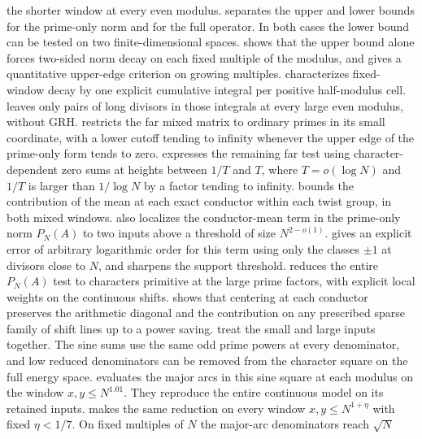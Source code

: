 \documentclass[11pt,a4paper]{article}
\numberwithin{equation}{section}
\begin{document}
the shorter window at every even modulus.
 separates the upper and lower bounds for
the prime-only norm and for the full operator. In both cases
the lower bound can be tested on two finite-dimensional spaces.
 shows that the upper bound alone forces
two-sided norm decay on each fixed multiple of the modulus, and gives
a quantitative upper-edge criterion on growing multiples.
 characterizes fixed-window decay
by one explicit cumulative integral per positive half-modulus cell.
 leaves only pairs of long divisors
in those integrals at every large even modulus, without GRH.
 restricts the far mixed matrix to
ordinary primes in its small coordinate, with a lower cutoff tending
to infinity whenever the upper edge of the prime-only form tends to zero.
 expresses the remaining far test
using character-dependent zero sums at heights between $1/T$ and
$T$, where $T=o(\log N)$ and $1/T$ is larger than $1/\log N$
by a factor tending to infinity.
 bounds the contribution of the
mean at each exact conductor within each twist group, in both
mixed windows.
 also localizes the conductor-mean
term in the prime-only norm $P_N(A)$ to two inputs above a threshold
of size $N^{2-o(1)}$.
 gives an explicit error of
arbitrary logarithmic order for this term using only the classes
$\pm1$ at divisors close to $N$, and sharpens the support threshold.
 reduces the entire $P_N(A)$ test
to characters primitive at the large prime factors, with explicit
local weights on the continuous shifts.
 shows that centering at each
conductor preserves the arithmetic diagonal and the contribution
on any prescribed sparse family of shift lines up to a power saving.
 treat
the small and large inputs together. The sine sums use the same
odd prime powers at every denominator, and low reduced denominators
can be removed from the character square on the full energy space.
 evaluates the major arcs in
this sine square at each modulus on the window $x,y\le N^{1.01}$.
They reproduce the entire continuous model on its retained inputs.
 makes the same reduction on every
window $x,y\le N^{1+\eta}$ with fixed $\eta<1/7$. On fixed
multiples of $N$ the major-arc denominators reach $\sqrt N$
\end{document}
